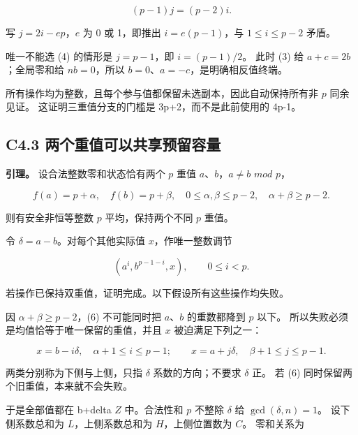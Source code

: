 \documentclass[11pt,a4paper]{article}
\theoremstyle{definition}
\numberwithin{equation}{section}
\begin{document}
\[
(p-1)j=(p-2)i.
\]

{写} {\ensuremath{j=2i-ep}，\ensuremath{e}} {为} {0} {或} {1，即推出} {\ensuremath{i=e(p-1)}，与} {\ensuremath{1\le i\le p-2}} {矛盾。}

{唯一不能选} {(4)} {的情形是} {\ensuremath{j=p-1}，即} {\ensuremath{i=(p-1)/2}。} {此时} {(3)} {给} {\ensuremath{a+c=2b}；全局零和给} {\ensuremath{nb=0}，所以} {\ensuremath{b=0}、\ensuremath{a=-c}，是明确相反值终端。}

{所有操作均为整数，且每个参与值都保留未选副本，因此自动保持所有非} {\ensuremath{p}} {同余见证。} {这证明三重值分支的门槛是} {3p+2，而不是此前使用的} {4p-1。}

\subsection*{\texorpdfstring{{C4.3} {两个重值可以共享预留容量}}{C4.3 两个重值可以共享预留容量}}\label{C4-h21}

\textbf{{引理。}} {设合法整数零和状态恰有两个} {\ensuremath{p}} {重值} {\ensuremath{a}、\ensuremath{b}，\ensuremath{a\ne b}} {\ensuremath{mod}} {\ensuremath{p}，}

\[
f(a)=p+\alpha,\quad f(b)=p+\beta,\quad
0\le\alpha,\beta\le p-2,\quad\alpha+\beta\ge p-2.
\tag{C4.5}
\]

{则有安全非恒等整数} {\ensuremath{p}} {平均，保持两个不同} {\ensuremath{p}} {重值。}

{令} {\ensuremath{\delta =a-b}。对每个其他实际值} {\ensuremath{x}，作唯一整数调节}

\[
(a^i,b^{p-1-i},x),\qquad0\le i<p.
\tag{C4.6}
\]

{若操作已保持双重值，证明完成。以下假设所有这些操作均失败。}

{因} {\ensuremath{\alpha +\beta \ge p-2}，(6)} {不可能同时把} {\ensuremath{a}、\ensuremath{b}} {的重数都降到} {\ensuremath{p}} {以下。} {所以失败必须是均值恰等于唯一保留的重值，并且} {\ensuremath{x}} {被迫满足下列之一：}

\[
x=b-i\delta,\quad\alpha+1\le i\le p-1;
\qquad
x=a+j\delta,\quad\beta+1\le j\le p-1.
\tag{C4.7}
\]

{两类分别称为下侧与上侧，只指} {\ensuremath{\delta }} {系数的方向；不要求} {\ensuremath{\delta }} {正。} {若} {(6)} {同时保留两个旧重值，本来就不会失败。}

{于是全部值都在} {b+delta} {\ensuremath{Z}} {中。合法性和} {\ensuremath{p}} {不整除} {\ensuremath{\delta }} {给} {\ensuremath{\operatorname{gcd}(\delta ,n)=1}。} {设下侧系数总和为} {\ensuremath{L}，上侧系数总和为} {\ensuremath{H}，上侧位置数为} {\ensuremath{C}。} {零和关系为}
\end{document}
